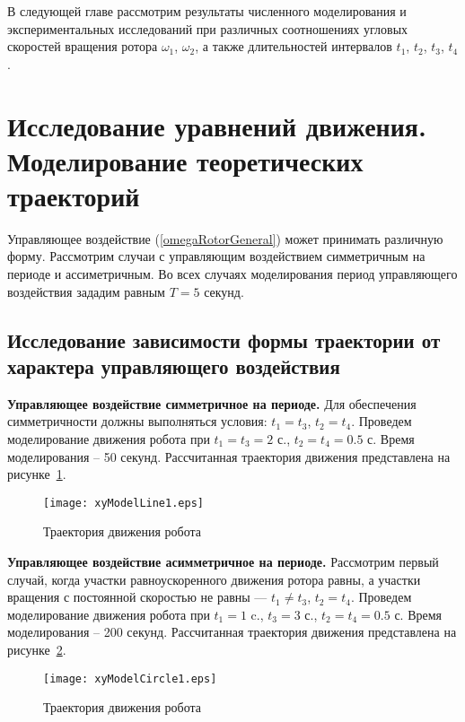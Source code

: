 В следующей главе рассмотрим результаты численного моделирования и экспериментальных исследований при различных соотношениях угловых скоростей вращения ротора $\omega_1$, $\omega_2$, а также длительностей интервалов $t_1$, $t_2$, $t_3$, $t_4$.


\section{Исследование уравнений движения. Моделирование теоретических траекторий}

Управляющее воздействие (\ref{omegaRotorGeneral}) может принимать различную форму. Рассмотрим случаи с управляющим воздействием симметричным на периоде и ассиметричным. Во всех случаях моделирования период управляющего воздействия зададим равным $T=5$ секунд. 


\subsection{Исследование зависимости формы траектории от характера управляющего воздействия}



\textbf{Управляющее воздействие симметричное на периоде.} Для обеспечения симметричности должны выполняться условия: $t_1=t_3$, $t_2=t_4$. Проведем моделирование движения робота при $t_1=t_3=2$ с., $t_2=t_4 = 0.5$ с. Время моделирования -- 50 секунд. Рассчитанная траектория движения представлена на рисунке~\ref{xyModelLine1}.

\begin{figure}[!ht]
	\centering
	\texttt{[image: xyModelLine1.eps]}
	\caption{Траектория движения робота}
	\label{xyModelLine1}
\end{figure}

\textbf{Управляющее воздействие асимметричное на периоде.} Рассмотрим первый случай, когда участки равноускоренного движения ротора равны, а участки вращения с постоянной скоростью не равны --- $t_1 \neq t_3$, $t_2=t_4$. Проведем моделирование движения робота при $t_1=1$ c., $t_3=3$ с., $t_2=t_4 = 0.5$ с. Время моделирования -- 200 секунд. Рассчитанная траектория движения представлена на рисунке~\ref{xyModelCircle1}.

\begin{figure}[!ht]
	\centering
	\texttt{[image: xyModelCircle1.eps]}
	\caption{Траектория движения робота}
	\label{xyModelCircle1}
\end{figure}

